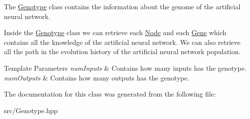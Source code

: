 The \hyperlink{class_indie_neat_1_1_genotype}{Genotype} class contains the information about the genome of the artificial neural network. 

Inside the \hyperlink{class_indie_neat_1_1_genotype}{Genotype} class we can retrieve each \hyperlink{class_indie_neat_1_1_genotype_1_1_node}{Node} and each \hyperlink{class_indie_neat_1_1_genotype_1_1_gene}{Gene} which contains all the knowledge of the artificial neural network. We can also retrieve all the path in the evolution history of the artificial neural network population. 
\begin{DoxyTemplParams}{Template Parameters}
{\em num\+Inputs} & Contains how many inputs has the genotype. \\
\hline
{\em num\+Outputs} & Contains how many outputs has the genotype. \\
\hline
\end{DoxyTemplParams}


The documentation for this class was generated from the following file\+:\begin{DoxyCompactItemize}
\item 
src/Genotype.\+hpp\end{DoxyCompactItemize}
